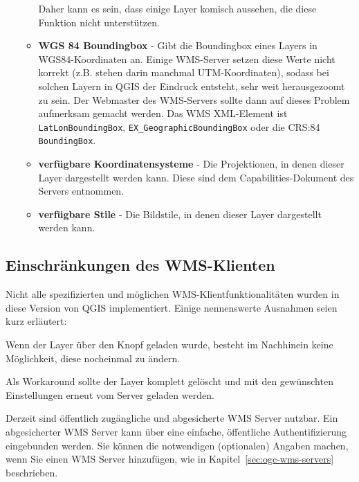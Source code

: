 \begin{itemize}[label=--]
\begin{itemize}[label=--]
      Daher kann es sein, dass einige Layer komisch aussehen, die diese
      Funktion nicht unterstützen.
\item \textbf{WGS 84 Boundingbox}
    - Gibt die Boundingbox eines Layers in WGS84-Koordinaten an. Einige
      WMS-Server setzen diese Werte nicht korrekt (z.B. stehen darin manchmal
      UTM-Koordinaten), sodass bei solchen Layern in QGIS der Eindruck
      entsteht, sehr weit herausgezoomt zu sein. Der Webmaster des
      WMS-Servers sollte dann auf dieses Problem aufmerksam gemacht werden.
      Das WMS XML-Element ist \texttt{LatLonBoundingBox},
      \texttt{EX\_GeographicBoundingBox} oder die CRS:84 \texttt{BoundingBox}.
\item \textbf{verfügbare Koordinatensysteme} 
    - Die Projektionen, in denen dieser Layer dargestellt werden kann. Diese
      sind dem Capabilities-Dokument des Servers entnommen.
\item \textbf{verfügbare Stile} 
    - Die Bildstile, in denen dieser Layer dargestellt werden kann.
\end{itemize}
\end{itemize}

\subsection{Einschränkungen des WMS-Klienten}
\label{sec:ogc-wms-limits}

Nicht alle spezifizierten und möglichen WMS-Klientfunktionalitäten wurden in
diese Version von QGIS implementiert. Einige nennenswerte Ausnahmen seien
kurz erläutert:


Wenn der Layer über den Knopf  geladen wurde, besteht im Nachhinein keine Möglichkeit, diese
nocheinmal zu ändern.

Als Workaround sollte der Layer komplett gelöscht und mit den gewünschten
Einstellungen erneut vom Server geladen werden.


Derzeit sind öffentlich zugängliche und abgesicherte WMS Server nutzbar. Ein
abgesicherter WMS Server kann über eine einfache, öffentliche Authentifizierung
eingebunden werden. Sie können die notwendigen (optionalen) Angaben machen,
wenn Sie einen WMS Server hinzufügen, wie in
Kapitel~\ref{sec:ogc-wms-servers} beschrieben.

